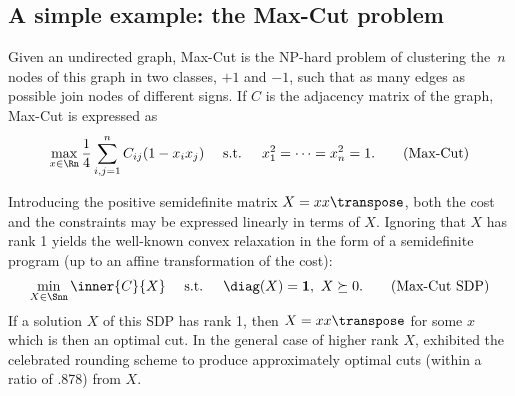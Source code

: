 \documentclass{article}
\newcommand{\1}{\mathbf{1}}
\begin{document}


\subsection*{A simple example: the Max-Cut problem}

Given an undirected graph, Max-Cut is the NP-hard problem of clustering the~$n$ nodes of this graph in two classes, $+1$ and $-1$, such that as many edges as possible join nodes of different signs. If $C$ is the adjacency matrix of the graph, Max-Cut is expressed as
\begin{align}
	\max_{x\in\Rn} \frac{1}{4}\sum_{i,j=1}^n C_{ij}(1-x_ix_j) \quad \textrm{ s.t. } \quad x_1^2 = \cdots = x_n^2 = 1.
	\tag{Max-Cut}
	\label{eq:maxcut}
\end{align}

Introducing the positive semidefinite matrix $X = xx\transpose$, both the cost and the constraints may be expressed linearly in terms of $X$. Ignoring that $X$ has rank 1 yields the well-known convex relaxation in the form of a semidefinite program (up to an affine transformation of the cost): %
\begin{align}
	\min_{X\in\Snn} \inner{C}{X} \quad \textrm{ s.t. } \quad \diag(X) = \1, \ X \succeq 0.
	\tag{Max-Cut SDP}
	\label{eq:maxcutsdp}
\end{align}
If a solution $X$ of this SDP has rank 1, then $X=xx\transpose$ for some $x$ which is then an optimal cut. In the general case of higher rank $X$, \citet{goemans1995maxcut} exhibited the celebrated rounding scheme to produce approximately optimal cuts (within a ratio of .878) from $X$.
\end{document}
